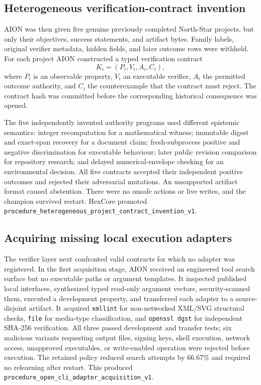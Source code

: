 \subsection{Heterogeneous verification-contract invention}

AION was then given five genuine previously completed North-Star projects, but
only their objectives, success statements, and artifact bytes.  Family labels,
original verifier metadata, hidden fields, and later outcome rows were withheld.
For each project AION constructed a typed verification contract
\[
K_i=(P_i,V_i,A_i,C_i),
\]
where $P_i$ is an observable property, $V_i$ an executable verifier, $A_i$ the
permitted outcome authority, and $C_i$ the counterexample that the contract must
reject.  The contract hash was committed before the corresponding historical
consequence was opened.

The five independently invented authority programs used different epistemic
semantics: integer recomputation for a mathematical witness; immutable digest
and exact-span recovery for a document claim; fresh-subprocess positive and
negative discrimination for executable behaviour; later public revision
comparison for repository research; and delayed numerical-envelope checking for
an environmental decision.  All five contracts accepted their independent
positive outcomes and rejected their adversarial mutations.  An unsupported
artifact format caused abstention.  There were no unsafe actions or live writes,
and the champion survived restart.  HexCore promoted
\texttt{procedure\_heterogeneous\_project\_contract\_invention\_v1}.

\subsection{Acquiring missing local execution adapters}

The verifier layer next confronted valid contracts for which no adapter was
registered.  In the first acquisition stage, AION received an engineered tool
search surface but no executable paths or argument templates.  It inspected
published local interfaces, synthesized typed read-only argument vectors,
security-scanned them, executed a development property, and transferred each
adapter to a source-disjoint artifact.  It acquired \texttt{xmllint} for
non-networked XML/SVG structural checks, \texttt{file} for media-type
classification, and \texttt{openssl dgst} for independent SHA-256 verification.
All three passed development and transfer tests; six malicious variants
requesting output files, signing keys, shell execution, network access,
unapproved executables, or write-enabled operation were rejected before
execution.  The retained policy reduced search attempts by $66.67\%$ and
required no relearning after restart.  This produced
\texttt{procedure\_open\_cli\_adapter\_acquisition\_v1}.

